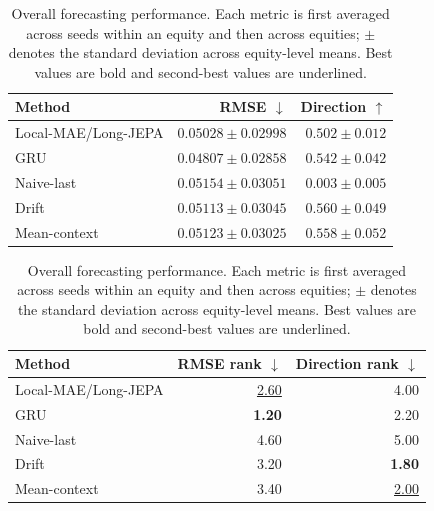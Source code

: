 \begin{table}[t]
\centering
\small
\caption{Overall forecasting performance. Each metric is first averaged across seeds within an equity and then across equities; $\pm$ denotes the standard deviation across equity-level means. Best values are bold and second-best values are underlined.}
\label{tab:main_metrics}
\begin{tabular}{lrr}
\toprule
Method & RMSE $\downarrow$ & Direction $\uparrow$ \\
\midrule
Local-MAE/Long-JEPA & \underline{$0.05028 \pm 0.02998$} & $0.502 \pm 0.012$ \\
GRU & \textbf{$0.04807 \pm 0.02858$} & $0.542 \pm 0.042$ \\
Naive-last & $0.05154 \pm 0.03051$ & $0.003 \pm 0.005$ \\
Drift & $0.05113 \pm 0.03045$ & \textbf{$0.560 \pm 0.049$} \\
Mean-context & $0.05123 \pm 0.03025$ & \underline{$0.558 \pm 0.052$} \\
\bottomrule
\end{tabular}
\par\medskip
\begin{tabular}{lrr}
\toprule
Method & RMSE rank $\downarrow$ & Direction rank $\downarrow$ \\
\midrule
Local-MAE/Long-JEPA & \underline{2.60} & 4.00 \\
GRU & \textbf{1.20} & 2.20 \\
Naive-last & 4.60 & 5.00 \\
Drift & 3.20 & \textbf{1.80} \\
Mean-context & 3.40 & \underline{2.00} \\
\bottomrule
\end{tabular}
\end{table}
